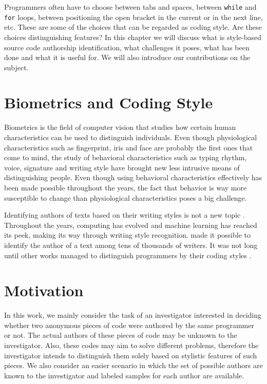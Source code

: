 
Programmers often have to choose between tabs and spaces, between \texttt{while} and \texttt{for} loops, between positioning the open bracket in the current or in the next line, etc. These are some of the choices that can be regarded as coding style. Are these choices distinguishing features? In this chapter we will discuss what is style-based source code authorship identification, what challenges it poses, what has been done and what it is useful for. We will also introduce our contributions on the subject. %

\section{Biometrics and Coding Style}

Biometrics is the field of computer vision that studies how certain human characteristics can be used to distinguish individuals. Even though physiological characteristics such as fingerprint, iris and face are probably the first ones that come to mind, the study of behavioral characteristics such as typing rhythm, voice, signature and writing style have brought new less intrusive means of distinguishing people. Even though using behavioral characteristics effectively has been made possible throughout the years, the fact that behavior is way more susceptible to change than physiological characteristics poses a big challenge. %



Identifying authors of texts based on their writing styles is not a new topic \cite{mendenhall}. Throughout the years, computing has evolved and machine learning has reached its peek, making its way through writing style recognition.  made it possible to identify the author of a text among tens of thousands of writers. It was not long until other works managed to distinguish programmers by their coding styles \cite{caliskan_2015}. %

\section{Motivation}

In this work, we mainly consider the task of an investigator interested in deciding whether two anonymous pieces of code were authored by the same programmer or not. The actual authors of these pieces of code may be unknown to the investigator. Also, these codes may aim to solve different problems, therefore the investigator intends to distinguish them solely based on stylistic features of such pieces. We also consider an easier scenario in which the set of possible authors are known to the investigator and labeled samples for each author are available. %

